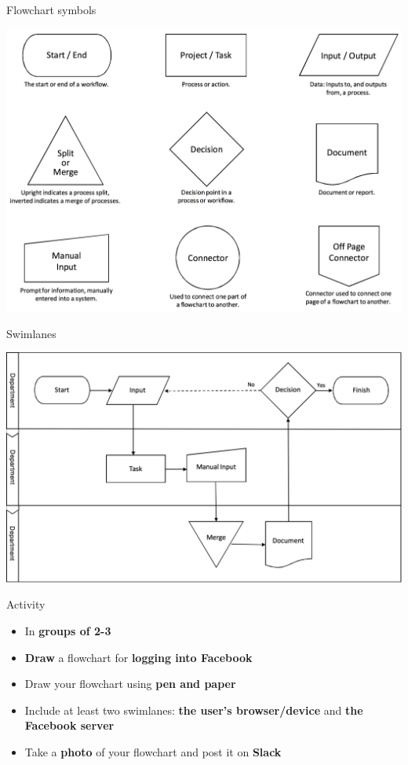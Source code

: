 \begin{frame}{Flowchart symbols}
	\begin{center}
		\includegraphics[height=0.8\textheight]{flowchart_symbols}
	\end{center}
\end{frame}

\begin{frame}{Swimlanes}
	\begin{center}
		\includegraphics[width=\textwidth]{swimlanes}
	\end{center}
\end{frame}

\begin{frame}{Activity}
	\begin{itemize}
		\item In \textbf{groups of 2-3}
		\item \textbf{Draw} a flowchart for \textbf{logging into Facebook}
		\item Draw your flowchart using \textbf{pen and paper}
		\item Include at least two swimlanes: \textbf{the user's browser/device} and \textbf{the Facebook server}
		\item Take a \textbf{photo} of your flowchart and post it on \textbf{Slack}
	\end{itemize}
\end{frame}

